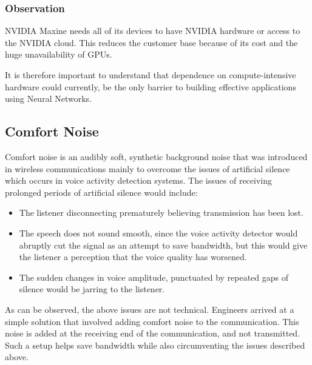 \subsubsection{Observation}

NVIDIA Maxine needs all of its devices to have NVIDIA hardware or access to the NVIDIA cloud. 
This reduces the customer base because of its cost and the huge unavailability of GPUs.

It is therefore important to understand that dependence on compute-intensive hardware could
currently, be the only barrier to building effective applications using Neural Networks.

\subsection{Comfort Noise}

Comfort noise is an audibly soft, synthetic background noise that was introduced in wireless communications 
mainly to overcome the issues of artificial silence which occurs in voice activity detection systems.
The issues of receiving prolonged periods of artificial silence would include:

\begin{itemize}
    \item The listener disconnecting prematurely believing transmission has been lost.
    \item The speech does not sound smooth, since the voice activity detector would abruptly cut the signal as an attempt to save bandwidth, but this would give the listener a perception that the voice quality has worsened.
    \item The sudden changes in voice amplitude, punctuated by repeated gaps of silence would be jarring to the listener.
\end{itemize}

As can be observed, the above issues are not technical. Engineers arrived at a simple solution that involved adding comfort noise to the communication. This noise is added at the receiving end of the communication, and not transmitted.~\cite{ComfortNoise}
Such a setup helps save bandwidth while also circumventing the issues described above.